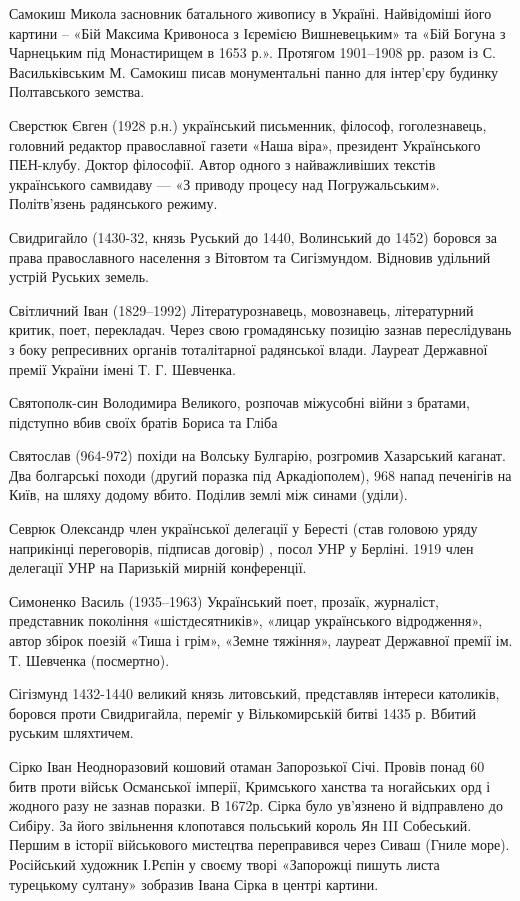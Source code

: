 Самокиш Микола  засновник батального живопису в Україні. Найвідоміші його картини – «Бій Максима Кривоноса з Ієремією Вишневецьким» та «Бій Богуна з Чарнецьким під Монастирищем в 1653 р.». Протягом 1901–1908 рр. разом із С. Васильківським М. Самокиш писав монументальні панно для інтер’єру будинку Полтавського земства. 

Сверстюк Євген (1928 р.н.) український письменник, філософ, гоголезнавець, головний редактор православної газети «Наша віра», президент Українського ПЕН-клубу. Доктор філософії. Автор одного з найважливіших текстів українського самвидаву — «З приводу процесу над Погружальським». Політв’язень радянського режиму.

Свидригайло (1430-32, князь Руський до 1440, Волинський до 1452) боровся за права православного населення з Вітовтом та Сигізмундом. Відновив удільний устрій Руських земель.

Світличний Іван (1829–1992) Літературознавець, мовознавець, літературний критик, поет, перекладач. Через свою громадянську позицію зазнав переслідувань з боку репресивних органів тоталітарної радянської влади. Лауреат Державної премії України імені Т. Г. Шевченка.

Святополк-син Володимира Великого, розпочав міжусобні війни з братами, підступно вбив своїх братів Бориса та Гліба

Святослав (964-972) похіди на Волську Булгарію, розгромив Хазарський каганат. Два болгарські походи (другий поразка під Аркадіополем), 968 напад печенігів на Київ, на шляху додому вбито. Поділив землі між синами (уділи).

Севрюк Олександр член української делегації у Бересті (став головою уряду наприкінці переговорів, підписав договір) , посол УНР у Берліні. 1919 член делегації УНР на Паризькій мирній конференції. 

Симоненко Bасиль (1935–1963) Український поет, прозаїк, журналіст, представник покоління «шістдесятників», «лицар українського відродження», автор збірок поезій «Тиша і грім», «Земне тяжіння», лауреат Державної премії ім. Т. Шевченка (посмертно).

Сігізмунд 1432-1440 великий князь литовський, представляв інтереси католиків, боровся проти Свидригайла, переміг у Вількомирській битві 1435 р. Вбитий руським шляхтичем.

Сірко Іван  Неодноразовий кошовий отаман Запорозької Січі. Провів понад 60 битв проти військ Османської імперії, Кримського ханства та ногайських орд і жодного разу не зазнав поразки. В 1672р. Сірка було ув’язнено й відправлено до Сибіру. За його звільнення клопотався польський король Ян III Собеський. Першим в історії військового мистецтва переправився через Сиваш (Гниле море). Російський художник І.Рєпін у своєму творі «Запорожці пишуть листа турецькому султану» зобразив Івана Сірка в центрі картини.


